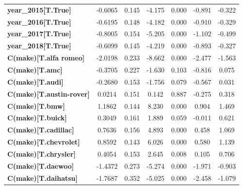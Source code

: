 \begin{center}
\begin{tabular}{lcccccc}
\textbf{year\_2015[T.True]}       &      -0.6065  &        0.145     &    -4.175  &         0.000        &       -0.891    &       -0.322     \\
\textbf{year\_2016[T.True]}       &      -0.6195  &        0.148     &    -4.182  &         0.000        &       -0.910    &       -0.329     \\
\textbf{year\_2017[T.True]}       &      -0.8005  &        0.154     &    -5.205  &         0.000        &       -1.102    &       -0.499     \\
\textbf{year\_2018[T.True]}       &      -0.6099  &        0.145     &    -4.219  &         0.000        &       -0.893    &       -0.327     \\
\textbf{C(make)[T.alfa romeo]}    &      -2.0198  &        0.233     &    -8.662  &         0.000        &       -2.477    &       -1.563     \\
\textbf{C(make)[T.amc]}           &      -0.3705  &        0.227     &    -1.630  &         0.103        &       -0.816    &        0.075     \\
\textbf{C(make)[T.audi]}          &      -0.2680  &        0.153     &    -1.756  &         0.079        &       -0.567    &        0.031     \\
\textbf{C(make)[T.austin-rover]}  &       0.0214  &        0.151     &     0.142  &         0.887        &       -0.275    &        0.318     \\
\textbf{C(make)[T.bmw]}           &       1.1862  &        0.144     &     8.230  &         0.000        &        0.904    &        1.469     \\
\textbf{C(make)[T.buick]}         &       0.3049  &        0.161     &     1.889  &         0.059        &       -0.011    &        0.621     \\
\textbf{C(make)[T.cadillac]}      &       0.7636  &        0.156     &     4.893  &         0.000        &        0.458    &        1.069     \\
\textbf{C(make)[T.chevrolet]}     &       0.8592  &        0.143     &     6.026  &         0.000        &        0.580    &        1.139     \\
\textbf{C(make)[T.chrysler]}      &       0.4054  &        0.153     &     2.645  &         0.008        &        0.105    &        0.706     \\
\textbf{C(make)[T.daewoo]}        &      -1.4372  &        0.273     &    -5.274  &         0.000        &       -1.971    &       -0.903     \\
\textbf{C(make)[T.daihatsu]}      &      -1.7687  &        0.352     &    -5.025  &         0.000        &       -2.458    &       -1.079     \\

\end{tabular}
\end{center}
